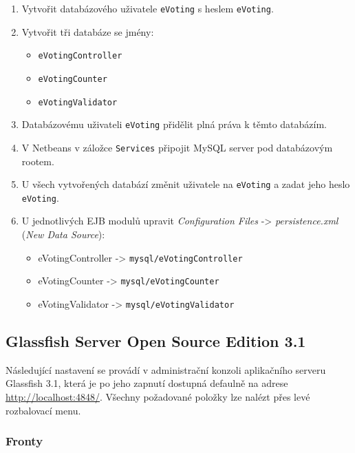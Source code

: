 \documentclass[11pt,twoside,a4paper]{book}
\begin{document}
\begin{enumerate}
    \item Vytvořit databázového uživatele \texttt{eVoting} s heslem \texttt{eVoting}.
    \item Vytvořit tři databáze se jmény:
    	 \begin{itemize}    	
       		 \item \texttt{eVotingController}
       		 \item \texttt{eVotingCounter}
      	 	 \item \texttt{eVotingValidator}
    	 \end{itemize}
    \item Databázovému uživateli \texttt{eVoting} přidělit plná práva k těmto databázím.
    \item V Netbeans v záložce \texttt{Services} připojit MySQL server pod databázovým rootem.
    \item U všech vytvořených databází změnit uživatele na \texttt{eVoting} a zadat jeho heslo \texttt{eVoting}.
    \item U jednotlivých EJB modulů upravit \textit{Configuration Files} -> \textit{persistence.xml} (\textit{New Data Source}):
    	\begin{itemize}
    		\item eVotingController -> \texttt{mysql/eVotingController}
			\item eVotingCounter -> \texttt{mysql/eVotingCounter}
        	\item eVotingValidator -> \texttt{mysql/eVotingValidator}
    	\end{itemize}    
\end{enumerate}

\subsection{Glassfish Server Open Source Edition 3.1}

Následující nastavení se provádí v administrační konzoli aplikačního serveru Glassfish 3.1, která je po jeho zapnutí dostupná defaulně na adrese \url{http://localhost:4848/}. Všechny požadované položky lze nalézt přes levé rozbalovací menu.

\subsubsection{Fronty}
\end{document}
